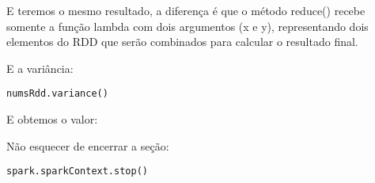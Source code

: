 E teremos o mesmo resultado, a diferença é que o método reduce() recebe somente a função lambda com dois argumentos (x e y), representando dois elementos do RDD que serão combinados para calcular o resultado final. 

E a variância:
\begin{lstlisting}[]
numsRdd.variance()
\end{lstlisting}

E obtemos o valor: \\
{}

Não esquecer de encerrar a seção:
\begin{lstlisting}[]
spark.sparkContext.stop()
\end{lstlisting}

\clearpage